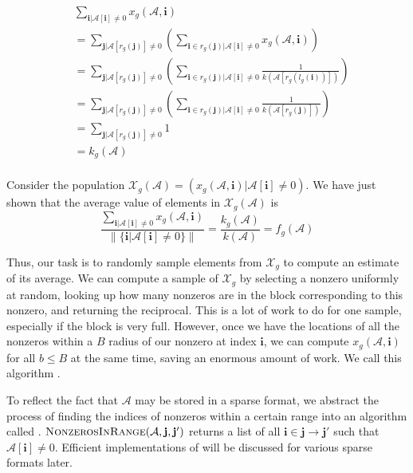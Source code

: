 \documentclass[12pt]{article}
\theoremstyle{dfn}
\numberwithin{equation}{section}
\numberwithin{figure}{section}
\renewcommand{\vec}[1] {\mathbf{#1}}
\newcommand{\Ten}[1] {\mathbf{\mathcal{#1}}}
\newcommand{\Pop}[1] {\mathcal{#1}}
\begin{document}
    \begin{align*}
      &\sum\limits_{\vec{i} | \Ten{A}[\vec{i}] \neq 0} x_g(\Ten{A}, \vec{i})\\ &= \sum\limits_{\vec{j} | \Ten{A}[r_g(\vec{j})] \neq 0} \left(\sum\limits_{\vec{i} \in r_g(\vec{j}) | \Ten{A}[\vec{i}] \neq 0} x_g(\Ten{A}, \vec{i})\right)\\
      &= \sum\limits_{\vec{j} | \Ten{A}[r_g(\vec{j})] \neq 0} \left(\sum\limits_{\vec{i} \in r_g(\vec{j}) | \Ten{A}[\vec{i}] \neq 0} \frac{1}{k(\Ten{A}[r_g(l_g(\vec{i}))])}\right)\\
      &= \sum\limits_{\vec{j} | \Ten{A}[r_g(\vec{j})] \neq 0} \left(\sum\limits_{\vec{i} \in r_g(\vec{j}) | \Ten{A}[\vec{i}] \neq 0} \frac{1}{k(\Ten{A}[r_g(\vec{j})])}\right)\\
      &= \sum\limits_{\vec{j} | \Ten{A}[r_g(\vec{j})] \neq 0} 1\\
      &= k_g(\Ten{A})\\
    \end{align*}

    Consider the population $\Pop{X}_g(\Ten{A}) = \left(x_g(\Ten{A}, \vec{i}) | \Ten{A}[\vec{i}] \neq 0\right)$. We have just shown that the average value of elements in $\Pop{X}_g(\Ten{A})$ is
    \[
      \frac{\sum\limits_{\vec{i} | \Ten{A}[\vec{i}] \neq 0} x_g(\Ten{A}, \vec{i})}{\|\{\vec{i} | \Ten{A}[\vec{i}] \neq 0\}\|} = \frac{k_g(\Ten{A})}{k(\Ten{A})} = f_g(\Ten{A})
    \]

    Thus, our task is to randomly sample elements from $\Pop{X}_g$ to compute an estimate of its average. We can compute a sample of $\Pop{X}_g$ by selecting a nonzero uniformly at random, looking up how many nonzeros are in the block corresponding to this nonzero, and returning the reciprocal. This is a lot of work to do for one sample, especially if the block is very full. However, once we have the locations of all the nonzeros within a $B$ radius of our nonzero at index $\vec{i}$, we can compute $x_g(\Ten{A}, \vec{i})$ for all $b \leq B$ at the same time, saving an enormous amount of work. We call this algorithm .

    To reflect the fact that $\Ten{A}$ may be stored in a sparse format, we abstract the process of finding the indices of nonzeros within a certain range into an algorithm called . $\textproc{NonzerosInRange}(\Ten{A}, \vec{j}, \vec{j}')$ returns a list of all $\vec{i} \in \vec{j} \to \vec{j}'$ such that $\Ten{A}[\vec{i}] \neq 0$. Efficient implementations of  will be discussed for various sparse formats later.
\end{document}
